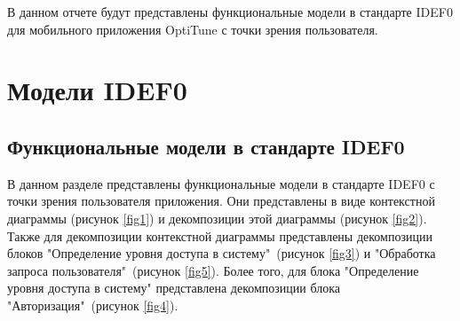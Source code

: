 \documentclass[14pt]{extreport}
\begin{document}
\pagestyle{empty} 


\pagestyle{plain}
\tableofcontents
 



\intro 

В данном отчете будут представлены функциональные модели в стандарте IDEF0 для мобильного приложения OptiTune с точки зрения пользователя.


\chapter{Модели IDEF0\label{chapter1}}
\section{Функциональные модели в стандарте IDEF0}

В данном разделе представлены функциональные модели в стандарте IDEF0 с точки зрения пользователя приложения. Они представлены в виде контекстной диаграммы (рисунок \ref{fig1}) и декомпозиции этой диаграммы  (рисунок \ref{fig2}). Также для декомпозиции контекстной диаграммы представлены декомпозиции блоков "Определение уровня доступа в систему"\ (рисунок \ref{fig3}) и "Обработка запроса пользователя"\ (рисунок \ref{fig5}). Более того, для блока "Определение уровня доступа в систему" представлена декомпозиции блока "Авторизация"\ (рисунок \ref{fig4}).
\end{document}
